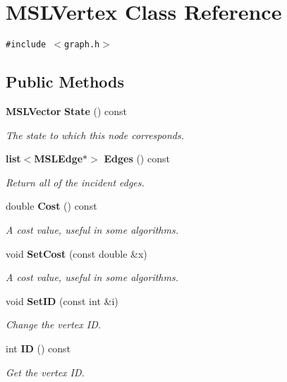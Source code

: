 \section{MSLVertex  Class Reference}
\label{classMSLVertex}
{\tt \#include $<$graph.h$>$}

\subsection*{Public Methods}
\begin{CompactItemize}
\item 
{\bf MSLVector} {\bf State} () const
\begin{CompactList}\small\item\em The state to which this node corresponds.\item\end{CompactList}\item 
{\bf list}$<${\bf MSLEdge}$\ast$$>$ {\bf Edges} () const
\begin{CompactList}\small\item\em Return all of the incident edges.\item\end{CompactList}\item 
double {\bf Cost} () const
\begin{CompactList}\small\item\em A cost value, useful in some algorithms.\item\end{CompactList}\item 
void {\bf Set\-Cost} (const double \&x)
\begin{CompactList}\small\item\em A cost value, useful in some algorithms.\item\end{CompactList}\item 
void {\bf Set\-ID} (const int \&i)
\begin{CompactList}\small\item\em Change the vertex ID.\item\end{CompactList}\item 
int {\bf ID} () const
\begin{CompactList}\small\item\em Get the vertex ID.\item\end{CompactList}\item 
$$
\end{CompactItemize}

